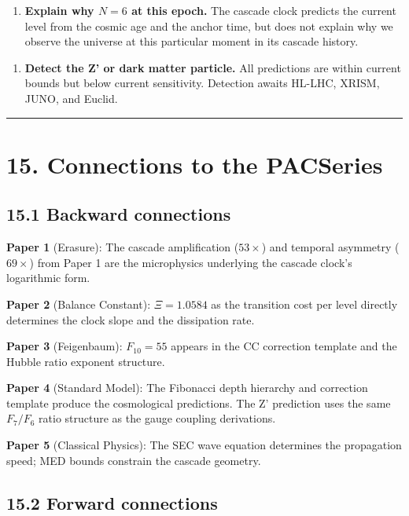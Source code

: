 \documentclass[11pt,a4paper]{article}
\providecommand{\tightlist}{\setlength{\itemsep}{0pt}\setlength{\parskip}{0pt}}
\begin{document}
\begin{enumerate}\tightlist
\item \textbf{Explain why $N = 6$ at this epoch.} The cascade clock predicts the current level from the cosmic age and the anchor time, but does not explain why we observe the universe at this particular moment in its cascade history.
\end{enumerate}

\begin{enumerate}\tightlist
\item \textbf{Detect the Z' or dark matter particle.} All predictions are within current bounds but below current sensitivity. Detection awaits HL-LHC, XRISM, JUNO, and Euclid.
\end{enumerate}

\begin{center}\rule{0.5\linewidth}{0.4pt}\end{center}

\section*{15. Connections to the PACSeries}

\subsection*{15.1 Backward connections}

\textbf{Paper 1} (Erasure): The cascade amplification ($53\times$) and temporal asymmetry ($69\times$) from Paper 1 are the microphysics underlying the cascade clock's logarithmic form.

\textbf{Paper 2} (Balance Constant): $\Xi = 1.0584$ as the transition cost per level directly determines the clock slope and the dissipation rate.

\textbf{Paper 3} (Feigenbaum): $F_{10} = 55$ appears in the CC correction template and the Hubble ratio exponent structure.

\textbf{Paper 4} (Standard Model): The Fibonacci depth hierarchy and correction template produce the cosmological predictions. The Z' prediction uses the same $F_7/F_6$ ratio structure as the gauge coupling derivations.

\textbf{Paper 5} (Classical Physics): The SEC wave equation determines the propagation speed; MED bounds constrain the cascade geometry.

\subsection*{15.2 Forward connections}
\end{document}
